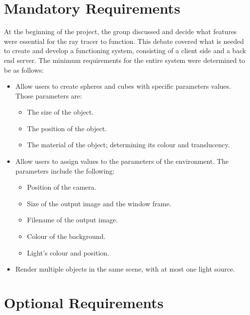 \documentclass[a4paper]{report}
\begin{document}
	\section{Mandatory Requirements}
	
	At the beginning of the project, the group discussed and decide what features were essential for the ray tracer to function. This debate covered what is needed to create and develop a functioning system, consisting of a client side and a back end server. The minimum requirements for the entire system were determined to be as follows:
	\begin{itemize}
		\item Allow users to create spheres and cubes with specific parameters values. Those parameters are:
		\begin{itemize}
			\item The size of the object.
			\item The position of the object.
			\item The material of the object; determining its colour and translucency.
		\end{itemize}
		\item Allow users to assign values to the parameters of the environment. The parameters include the following:
		\begin{itemize}
			\item Position of the camera.
			\item Size of the output image and the window frame.
			\item Filename of the output image.
			\item Colour of the background.
			\item Light's colour and position.
		\end{itemize}
		\item Render multiple objects in the same scene, with at most one light source.
	\end{itemize}
	
	\section{Optional Requirements}
	
\end{document}
